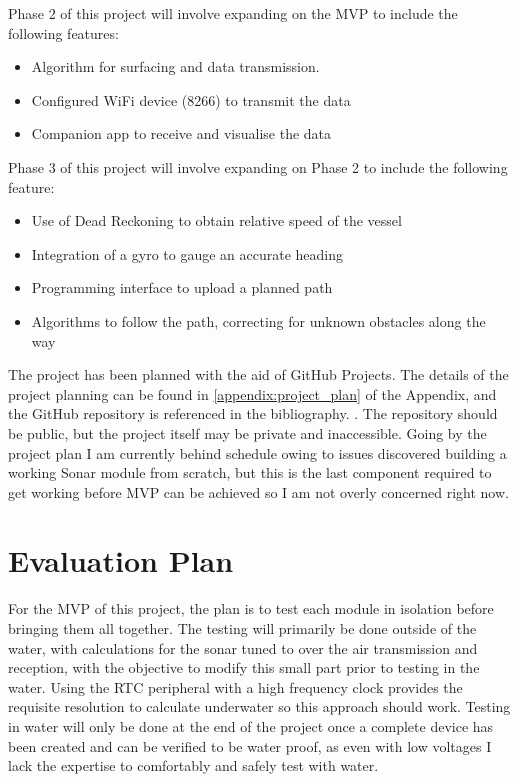 \documentclass[11pt,a4paper,titlepage]{report}
\begin{document}
	Phase 2 of this project will involve expanding on the MVP to include the following features:
	
	\begin{itemize}
		\item Algorithm for surfacing and data transmission.
		\item Configured WiFi device (8266) to transmit the data
		\item Companion app to receive and visualise the data
	\end{itemize}
	
	Phase 3 of this project will involve expanding on Phase 2 to include the following feature:
	\begin{itemize}
		\item Use of Dead Reckoning to obtain relative speed of the vessel
		\item Integration of a gyro to gauge an accurate heading
		\item Programming interface to upload a planned path
		\item Algorithms to follow the path, correcting for unknown obstacles along the way
	\end{itemize}
	
	The project has been planned with the aid of GitHub Projects\cite{GITHUB_PROJECTS_DOCUMENTATION}. The details of the project planning can be found in \ref{appendix:project_plan} of the Appendix, and the GitHub repository is referenced in the bibliography. \cite{GITHUB_REPO} \cite{GITHUB_PROJECT}. The repository should be public, but the project itself may be private and inaccessible. Going by the project plan I am currently behind schedule owing to issues discovered building a working Sonar module from scratch, but this is the last component required to get working before MVP can be achieved so I am not overly concerned right now. 
	
	\section*{Evaluation Plan}
	For the MVP of this project, the plan is to test each module in isolation before bringing them all together. The testing will primarily be done outside of the water, with calculations for the sonar tuned to over the air transmission and reception, with the objective to modify this small part prior to testing in the water. Using the RTC peripheral with a high frequency clock provides the requisite resolution to calculate underwater so this approach should work. Testing in water will only be done at the end of the project once a complete device has been created and can be verified to be water proof, as even with low voltages I lack the expertise to comfortably and safely test with water.
	
\end{document}
